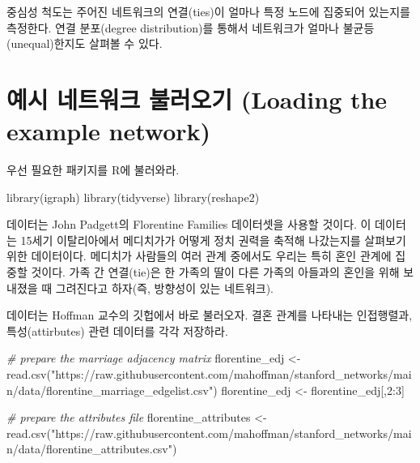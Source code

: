 \documentclass[
]{book}
\newenvironment{Shaded}{\begin{snugshade}}{\end{snugshade}}
\newcommand{\CommentTok}[1]{\textcolor[rgb]{0.56,0.35,0.01}{\textit{#1}}}
\newcommand{\DecValTok}[1]{\textcolor[rgb]{0.00,0.00,0.81}{#1}}
\newcommand{\FunctionTok}[1]{\textcolor[rgb]{0.00,0.00,0.00}{#1}}
\newcommand{\NormalTok}[1]{#1}
\newcommand{\OtherTok}[1]{\textcolor[rgb]{0.56,0.35,0.01}{#1}}
\newcommand{\SpecialCharTok}[1]{\textcolor[rgb]{0.00,0.00,0.00}{#1}}
\newcommand{\StringTok}[1]{\textcolor[rgb]{0.31,0.60,0.02}{#1}}
\begin{document}
중심성 척도는 주어진 네트워크의 연결(ties)이 얼마나 특정 노드에 집중되어 있는지를 측정한다. 연결 분포(degree distribution)를 통해서 네트워크가 얼마나 불균등(unequal)한지도 살펴볼 수 있다.

\hypertarget{uxc608uxc2dc-uxb124uxd2b8uxc6ccuxd06c-uxbd88uxb7ecuxc624uxae30-loading-the-example-network}{%
\section{예시 네트워크 불러오기 (Loading the example network)}\label{uxc608uxc2dc-uxb124uxd2b8uxc6ccuxd06c-uxbd88uxb7ecuxc624uxae30-loading-the-example-network}}

우선 필요한 패키지를 R에 불러와라.

\begin{Shaded}
\begin{Highlighting}[]
\FunctionTok{library}\NormalTok{(igraph)}
\FunctionTok{library}\NormalTok{(tidyverse)}
\FunctionTok{library}\NormalTok{(reshape2)}
\end{Highlighting}
\end{Shaded}

데이터는 John Padgett의 Florentine Families 데이터셋을 사용할 것이다. 이 데이터는 15세기 이탈리아에서 메디치가가 어떻게 정치 권력을 축적해 나갔는지를 살펴보기 위한 데이터이다. 메디치가 사람들의 여러 관계 중에서도 우리는 특히 혼인 관계에 집중할 것이다. 가족 간 연결(tie)은 한 가족의 딸이 다른 가족의 아들과의 혼인을 위해 보내졌을 때 그려진다고 하자(즉, 방향성이 있는 네트워크).

데이터는 Hoffman 교수의 깃헙에서 바로 불러오자. 결혼 관계를 나타내는 인접행렬과, 특성(attirbutes) 관련 데이터를 각각 저장하라.

\begin{Shaded}
\begin{Highlighting}[]
\CommentTok{\# prepare the marriage adjacency matrix}
\NormalTok{florentine\_edj }\OtherTok{\textless{}{-}} \FunctionTok{read.csv}\NormalTok{(}\StringTok{"https://raw.githubusercontent.com/mahoffman/stanford\_networks/main/data/florentine\_marriage\_edgelist.csv"}\NormalTok{)}
\NormalTok{florentine\_edj }\OtherTok{\textless{}{-}}\NormalTok{ florentine\_edj[,}\DecValTok{2}\SpecialCharTok{:}\DecValTok{3}\NormalTok{]}

\CommentTok{\# prepare the attributes file}
\NormalTok{florentine\_attributes }\OtherTok{\textless{}{-}} \FunctionTok{read.csv}\NormalTok{(}\StringTok{"https://raw.githubusercontent.com/mahoffman/stanford\_networks/main/data/florentine\_attributes.csv"}\NormalTok{)}
\end{Highlighting}
\end{Shaded}
\end{document}
